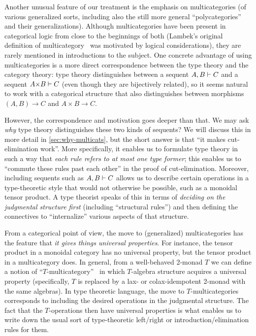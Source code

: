 Another unusual feature of our treatment is the emphasis on multicategories (of various generalized sorts, including also the still more general ``polycategories'' and their generalizations).
Although multicategories have been present in categorical logic from close to the beginnings of both (Lambek's original definition of multicategory~\cite{lambek:dedsys-ii} was motivated by logical considerations), they are rarely mentioned in introductions to the subject.
One concrete advantage of using multicategories is a more direct correspondence between the type theory and the category theory: type theory distinguishes between a sequent $A,B\vdash C$ and a sequent $A\times B\types C$ (even though they are bijectively related), so it seems natural to work with a categorical structure that also distinguishes between morphisms $(A,B)\to C$ and $A\times B\to C$.

However, the correspondence and motivation goes deeper than that.
We may ask \emph{why} type theory distinguishes these two kinds of sequents?
We will discuss this in more detail in \cref{sec:why-multicats}, but the short answer is that ``it makes cut-elimination work''.
More specifically, it enables us to formulate type theory in such a way that \emph{each rule refers to at most one type former}; this enables us to ``commute these rules past each other'' in the proof of cut-elimination.
Moreover, including sequents such as $A,B\vdash C$ allows us to describe certain operations in a type-theoretic style that would not otherwise be possible, such as a monoidal tensor product.
A type theorist speaks of this in terms of \emph{deciding on the judgmental structure first} (including ``structural rules'') and then defining the connectives to ``internalize'' various aspects of that structure.

From a categorical point of view, the move to (generalized) multicategories has the feature that \emph{it gives things universal properties}.
For instance, the tensor product in a monoidal category has no universal property, but the tensor product in a multicategory does.
In general, from a well-behaved 2-monad $T$ we can define a notion of ``$T$-multicategory''~\cite{burroni:t-cats,leinster:higher-opds,hermida:coh-univ,cs:multicats} in which $T$-algebra structure acquires a universal property (specifically, $T$ is replaced by a lax- or colax-idempotent 2-monad with the same algebras).
In type theoretic language, the move to $T$-multicategories corresponds to including the desired operations in the judgmental structure.
The fact that the $T$-operations then have universal properties is what enables us to write down the usual sort of type-theoretic left/right or introduction/elimination rules for them.

